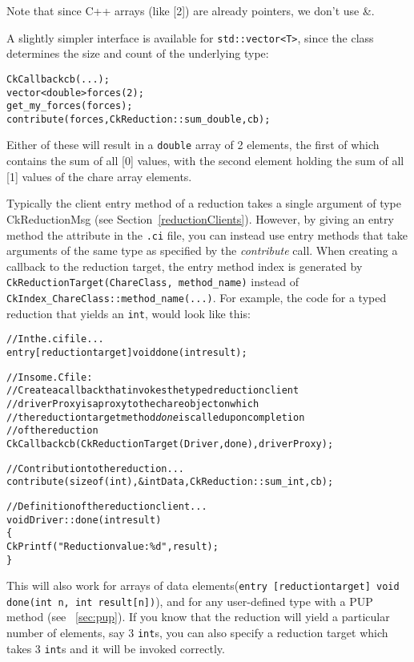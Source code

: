 Note that since C++ arrays (like [2]) are already pointers, we 
don't use \&.

A slightly simpler interface is available for \verb+std::vector<T>+,
since the class determines the size and count of the underlying type:

\begin{alltt}
    CkCallback cb(...);
    vector<double> forces(2);
    get_my_forces(forces);
    contribute(forces, CkReduction::sum_double, cb);
\end{alltt}

Either of these will result in a {\tt double} array of 2 elements, the first of which
contains the sum of all [0] values, with the second element
holding the sum of all [1] values of the chare array elements.

Typically the client entry method of a reduction takes a single argument of
type CkReductionMsg (see Section~\ref{reductionClients}). However, by giving an entry method the
 attribute in the {\tt .ci} file, you can instead use entry methods that take
arguments of the same type as specified by the {\em contribute} call.  
When creating a callback to the
reduction target, the entry method index is generated by 
{\tt CkReductionTarget(ChareClass, method\_name)} 
instead of {\tt CkIndex\_ChareClass::method\_name(...)}.
For example,
the code for a typed reduction that yields an {\tt int}, would look like this:

\begin{alltt}
  // In the .ci file...
  entry [reductiontarget] void done(int result);

  // In some .C file: 
  // Create a callback that invokes the typed reduction client
  // driverProxy is a proxy to the chare object on which 
  // the reduction target method {\em done} is called upon completion 
  // of the reduction
  CkCallback cb(CkReductionTarget(Driver, done), driverProxy);

  // Contribution to the reduction...
  contribute(sizeof(int), &intData, CkReduction::sum_int, cb);

  // Definition of the reduction client...
  void Driver::done(int result) 
  \{
    CkPrintf("Reduction value: \%d", result);
  \}
\end{alltt}

This will also work for arrays of data 
elements({\tt entry [reductiontarget] void done(int n, int result[n])}), 
and for any user-defined type with a PUP method
(see ~\ref{sec:pup}). If you know that the reduction will yield a particular
number of elements, say 3 {\tt int}s, you can also specify a reduction target which
takes 3 {\tt int}s and it will be invoked correctly. 

